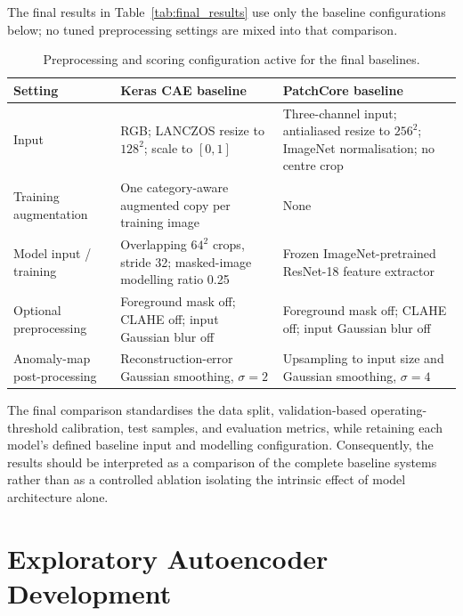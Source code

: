 \documentclass[11pt, a4paper]{article}
\begin{document}
The final results in Table~\ref{tab:final_results} use only the baseline configurations below; no tuned preprocessing settings are mixed into that comparison.

\begin{table}[H]
\centering
\caption{Preprocessing and scoring configuration active for the final baselines.}
\label{tab:baseline-config}
\footnotesize
\renewcommand{\arraystretch}{1.0}
\begin{tabular}{
    >{\raggedright\arraybackslash}p{}
    >{\raggedright\arraybackslash}p{}
    >{\raggedright\arraybackslash}p{}
}
\toprule
\textbf{Setting} &
\textbf{Keras CAE baseline} &
\textbf{PatchCore baseline} \\
\midrule
Input &
RGB; LANCZOS resize to $128^2$; scale to $[0,1]$ &
Three-channel input; antialiased resize to $256^2$; ImageNet normalisation; no centre crop \\
\addlinespace[0.4em]
Training augmentation &
One category-aware augmented copy per training image &
None \\
\addlinespace[0.4em]
Model input / training &
Overlapping $64^2$ crops, stride 32; masked-image modelling ratio 0.25 &
Frozen ImageNet-pretrained ResNet-18 feature extractor \\
\addlinespace[0.4em]
Optional preprocessing &
Foreground mask off; CLAHE off; input Gaussian blur off &
Foreground mask off; CLAHE off; input Gaussian blur off \\
\addlinespace[0.4em]
Anomaly-map post-processing &
Reconstruction-error Gaussian smoothing, $\sigma=2$ &
Upsampling to input size and Gaussian smoothing, $\sigma=4$ \\
\bottomrule
\end{tabular}
\end{table}

The final comparison standardises the data split, validation-based operating-threshold calibration, test samples, and evaluation metrics, while retaining each model's defined baseline input and modelling configuration. Consequently, the results should be interpreted as a comparison of the complete baseline systems rather than as a controlled ablation isolating the intrinsic effect of model architecture alone.

\section{Exploratory Autoencoder Development}
\label{sec:exploration}
\end{document}
